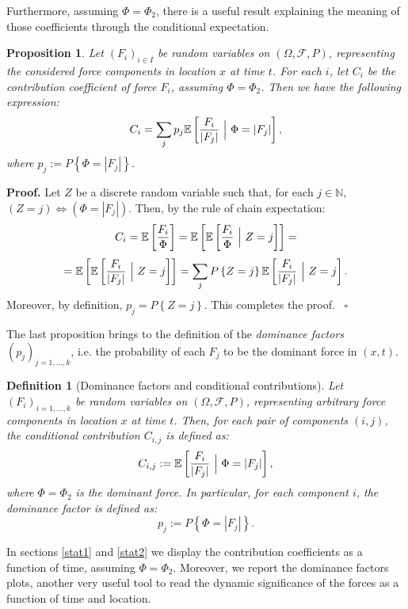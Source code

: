 \documentclass{article}
\newtheorem{definition}[theorem]{Definition}
\newtheorem{proposition}[theorem]{Proposition}
\newenvironment{proof}[1][Proof]{\noindent\textbf{#1.} }{\ $\square$}
\begin{document}
Furthermore, assuming $\Phi=\Phi_2$, there is a useful result explaining the meaning of those coefficients through the conditional expectation.
\begin{proposition}
Let $(F_i)_{i\in I}$ be random variables on $(\Omega, \mathcal F, P)$, representing the considered force components in location $x$ at time $t$. For each $i$, let $C_i$ be the contribution coefficient of force $F_i$, assuming $\Phi=\Phi_2$. Then we have the following expression:
$$C_i=\sum_j p_j \mathbb E\left[\frac{F_i}{|F_j|}\ \Big{|}\ \Phi=|F_j|\right],$$
where $p_j:=P\left\{\Phi=|F_j|\right\}$.
\end{proposition}

\begin{proof}
Let $Z$ be a discrete random variable such that, for each $j\in\mathbb N$, $(Z=j) \Longleftrightarrow (\Phi=|F_j|)$. Then, by the rule of chain expectation:
$$C_i=\mathbb E\left[\frac{F_i}{\Phi}\right]=\mathbb E\left[\mathbb E\left[\frac{F_i}{\Phi}\ \Big{|}\ Z=j\right]\right]=$$
$$=\mathbb E\left[\mathbb E\left[\frac{F_i}{|F_j|}\ \Big{|}\ Z=j\right]\right]=\sum_j P\left\{Z=j\right\} \mathbb E\left[\frac{F_i}{|F_j|}\ \Big{|}\ Z=j\right].$$
Moreover, by definition, $p_j=P\left\{Z=j\right\}$. This completes the proof.
\end{proof}

The last proposition brings to the definition of the \emph{dominance factors} $(p_j)_{j=1,\dots, k}$, i.e. the probability of each $F_j$ to be the dominant force in $(x,t)$.

\begin{definition}[Dominance factors and conditional contributions]
Let $(F_i)_{i=1,\dots, k}$ be random variables on $(\Omega, \mathcal F, P)$, representing arbitrary force components in location $x$ at time $t$. Then, for each pair of components $(i,j)$, the conditional contribution $C_{i,j}$ is defined as:
$$C_{i,j}:=\mathbb E\left[\frac{F_i}{|F_j|}\ \Big{|}\ \Phi=|F_j|\right],$$
where $\Phi=\Phi_2$ is the dominant force. In particular, for each component $i$, the dominance factor is defined as:
$$p_j:=P\left\{\Phi=|F_j|\right\}.$$
\end{definition}

In sections \ref{stat1} and \ref{stat2} we display the contribution coefficients as a function of time, assuming $\Phi=\Phi_2$. Moreover, we report the dominance factors plots, another very useful tool to read the dynamic significance of the forces as a function of time and location.

\newpage
\end{document}
